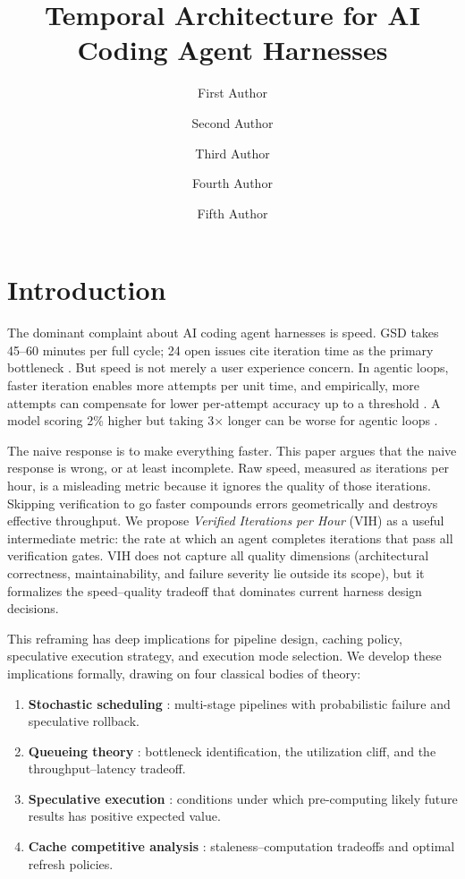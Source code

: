 \documentclass[11pt, a4paper, copyright]{googledeepmind}
\title{Temporal Architecture for AI Coding Agent Harnesses}
\author[1]{First Author}
\author[2]{Second Author}
\author[2]{Third Author}
\author[1]{Fourth Author}
\author[1]{Fifth Author}
\affil[*]{Equal Contribution}
\affil[1]{Affiliation 1}
\affil[2]{Affiliation 2}
\begin{document}
\maketitle

\section{Introduction}\label{sec:intro}

The dominant complaint about AI coding agent harnesses is speed. GSD takes 45--60 minutes per full cycle; 24 open issues cite iteration time as the primary bottleneck \citep{iskohm2026comparison}. But speed is not merely a user experience concern. In agentic loops, faster iteration enables more attempts per unit time, and empirically, more attempts can compensate for lower per-attempt accuracy up to a threshold \citep{sweeffi2025}. A model scoring 2\% higher but taking 3$\times$ longer can be worse for agentic loops \citep{iskohm2026comparison}.

The naive response is to make everything faster. This paper argues that the naive response is wrong, or at least incomplete. Raw speed, measured as iterations per hour, is a misleading metric because it ignores the quality of those iterations. Skipping verification to go faster compounds errors geometrically and destroys effective throughput. We propose \emph{Verified Iterations per Hour} (VIH) as a useful intermediate metric: the rate at which an agent completes iterations that pass all verification gates. VIH does not capture all quality dimensions (architectural correctness, maintainability, and failure severity lie outside its scope), but it formalizes the speed--quality tradeoff that dominates current harness design decisions.

This reframing has deep implications for pipeline design, caching policy, speculative execution strategy, and execution mode selection. We develop these implications formally, drawing on four classical bodies of theory:

\begin{enumerate}[label=(\roman*)]
    \item \textbf{Stochastic scheduling} \citep{graham1966bounds, mohring1984stochastic, pinedo2016scheduling}: multi-stage pipelines with probabilistic failure and speculative rollback.
    \item \textbf{Queueing theory} \citep{little1961proof, kingman1961single, hopp2000factory}: bottleneck identification, the utilization cliff, and the throughput--latency tradeoff.
    \item \textbf{Speculative execution} \citep{tomasulo1967efficient, smith1981branch, yeh1991two}: conditions under which pre-computing likely future results has positive expected value.
    \item \textbf{Cache competitive analysis} \citep{belady1966replacement, sleator1985amortized, denning1968working}: staleness--computation tradeoffs and optimal refresh policies.
\end{enumerate}
\end{document}
